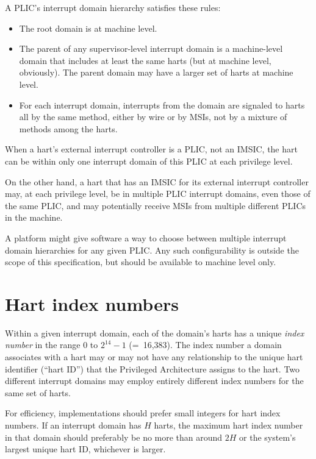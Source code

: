 A PLIC's interrupt domain hierarchy satisfies these rules:
\begin{itemize}

\item
The root domain is at machine level.

\item
The parent of any supervisor-level interrupt domain is a machine-level
domain that includes at least the same harts (but at machine level,
obviously).
The parent domain may have a larger set of harts at machine level.

\item
For each interrupt domain, interrupts from the domain are signaled
to harts all by the same method, either by wire or by MSIs, not by a
mixture of methods among the harts.

\end{itemize}

When a {\RISCV} hart's external interrupt controller is a PLIC, not an
IMSIC, the hart can be within only one interrupt domain of this PLIC at
each privilege level.

On the other hand, a hart that has an IMSIC for its external interrupt
controller may, at each privilege level, be in multiple PLIC interrupt
domains, even those of the same PLIC, and may potentially receive MSIs
from multiple different PLICs in the machine.

A platform might give software a way to choose between multiple
interrupt domain hierarchies for any given PLIC.
Any such configurability is outside the scope of this specification,
but should be available to machine level only.

\section{Hart index numbers}

Within a given interrupt domain, each of the domain's harts has a
unique \emph{index number} in the range 0 to ${\mbox{2}^{14}-\mbox{1}}$
(=~16,383).
The index number a domain associates with a hart may or may not have
any relationship to the unique hart identifier (``hart ID'') that the
{\RISCV} Privileged Architecture assigns to the hart.
Two different interrupt domains may employ entirely different index
numbers for the same set of harts.

\begin{commentary}
For efficiency, implementations should prefer small integers for hart
index numbers.
If an interrupt domain has $H$ harts, the maximum hart index number in
that domain should preferably be no more than around $\mbox{2}H$ or the
system's largest unique {\RISCV} hart ID, whichever is larger.
\end{commentary}


